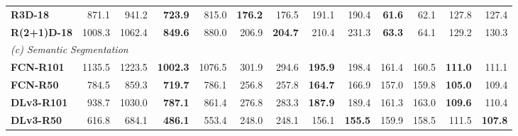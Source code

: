 \begin{table}[t]
{\begin{tabular}{lrrrrrrrrrrrr}
\textbf{R3D-18} & 871.1 & 941.2 & \textcolor{blue!70!black}{\textbf{723.9}} & 815.0 & \textcolor{blue!70!black}{\textbf{176.2}} & 176.5 & 191.1 & 190.4 & \textcolor{blue!70!black}{\textbf{61.6}} & 62.1 & 127.8 & 127.4 \\
\textbf{R(2+1)D-18} & 1008.3 & 1062.4 & \textcolor{blue!70!black}{\textbf{849.6}} & 880.0 & 206.9 & \textcolor{blue!70!black}{\textbf{204.7}} & 210.4 & 231.3 & \textcolor{blue!70!black}{\textbf{63.3}} & 64.1 & 129.2 & 130.3 \\
\midrule
\multicolumn{13}{l}{\textit{(c) Semantic Segmentation}} \\
\midrule
\textbf{FCN-R101} & 1135.5 & 1223.5 & \textcolor{blue!70!black}{\textbf{1002.3}} & 1076.5 & 301.9 & 294.6 & \textcolor{blue!70!black}{\textbf{195.9}} & 198.4 & 161.4 & 160.5 & \textcolor{blue!70!black}{\textbf{111.0}} & 111.1 \\
\textbf{FCN-R50} & 784.5 & 859.3 & \textcolor{blue!70!black}{\textbf{719.7}} & 786.1 & 256.8 & 257.8 & \textcolor{blue!70!black}{\textbf{164.7}} & 166.9 & 157.0 & 159.8 & \textcolor{blue!70!black}{\textbf{105.0}} & 109.4 \\
\textbf{DLv3-R101} & 938.7 & 1030.0 & \textcolor{blue!70!black}{\textbf{787.1}} & 861.4 & 276.8 & 283.3 & \textcolor{blue!70!black}{\textbf{187.9}} & 189.4 & 161.3 & 163.0 & \textcolor{blue!70!black}{\textbf{109.6}} & 110.4 \\
\textbf{DLv3-R50} & 616.8 & 684.1 & \textcolor{blue!70!black}{\textbf{486.1}} & 553.4 & 248.0 & 248.1 & 156.1 & \textcolor{blue!70!black}{\textbf{155.5}} & 159.9 & 158.5 & 111.5 & \textcolor{blue!70!black}{\textbf{107.8}} \\
\bottomrule
\end{tabular}%
}
\end{table}
